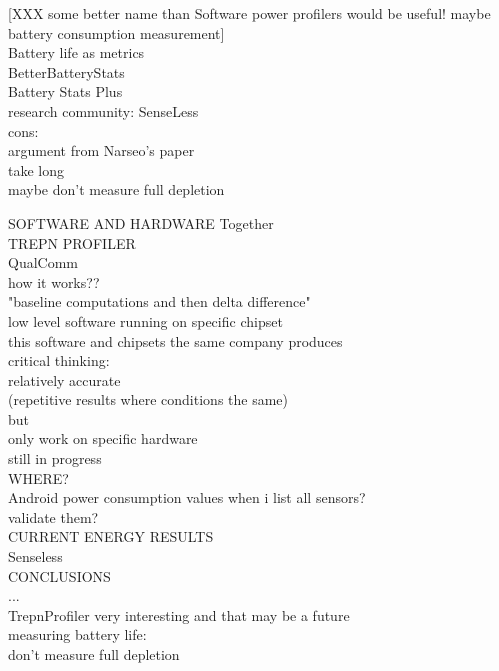 [XXX some better name than Software power profilers would be useful!
 maybe battery consumption measurement]\\

Battery life as metrics\\
	BetterBatteryStats\\
	Battery Stats Plus\\
	research community: SenseLess\cite{benabdesslem:senseless}\\
	cons:\\
		argument from Narseo's paper\\
		take long\\
			maybe don't measure full depletion
	
	
	
SOFTWARE AND HARDWARE Together\\
	TREPN PROFILER\cite{qualcomm:trepnprofiler}\\
		QualComm\\
		how it works??\\
			"baseline computations and then delta difference"\\	
			low level software running on specific chipset\\
				this software and chipsets the same company produces\\
		critical thinking:\\
			relatively accurate\\
				(repetitive results where conditions the same)\\
			but\\
				only work on specific hardware \\
				still in progress\\
		
WHERE?\\
	Android power consumption values when i list all sensors?\\
		validate them?\\

CURRENT ENERGY RESULTS\\
	Senseless\cite{benabdesslem:senseless}\\
	

CONCLUSIONS\\
	...\\
	TrepnProfiler very interesting and that may be a future\\
	measuring battery life:\\
		 don't measure full depletion\\



